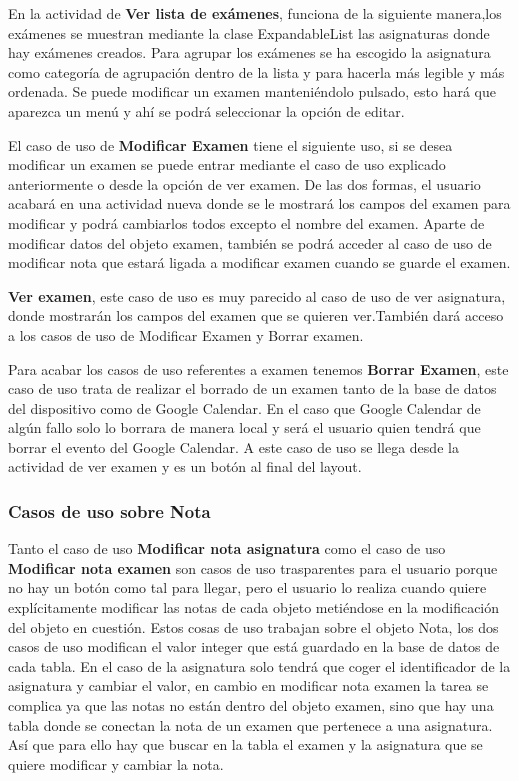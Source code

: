 En la actividad de \textbf{Ver lista de exámenes}, funciona de la siguiente manera,los exámenes se muestran mediante la clase ExpandableList las asignaturas donde hay exámenes creados. Para agrupar los exámenes se ha escogido la asignatura como categoría de agrupación dentro de la lista y para hacerla más legible y más ordenada.
Se puede modificar un examen manteniéndolo pulsado, esto hará que aparezca un menú y ahí se podrá seleccionar la opción de editar.

El caso de uso de \textbf{Modificar Examen} tiene el siguiente uso, si se desea modificar un examen se puede entrar mediante el caso de uso explicado anteriormente o desde la opción de ver examen. De las dos formas, el usuario acabará en una actividad nueva donde se le mostrará los campos del examen para modificar y podrá cambiarlos todos excepto el nombre del examen.
Aparte de modificar datos del objeto examen, también se podrá acceder al caso de uso de modificar nota  que estará ligada a modificar examen cuando se guarde el examen.

\textbf{Ver examen}, este caso de uso es muy parecido al caso de uso de ver asignatura, donde mostrarán los campos del examen que se quieren ver.También dará acceso a los casos de uso de Modificar Examen y Borrar examen.


Para acabar los casos de uso referentes a examen tenemos \textbf{Borrar Examen}, este caso de uso trata de realizar el borrado de un examen tanto de la base de datos del dispositivo como de Google Calendar. En el caso que Google Calendar de algún fallo solo lo borrara de manera local y será el usuario quien tendrá que borrar el evento del Google Calendar.
A este caso de uso se llega desde la actividad de ver examen y es un botón al final del layout.

\subsubsection{Casos de uso sobre Nota}
\label{subsubsecc:Casos de uso sobre Nota}

Tanto el caso de uso \textbf{Modificar nota asignatura} como el caso de uso \textbf{Modificar nota examen} son casos de uso trasparentes para el usuario porque no hay un botón como tal para llegar, pero el usuario lo realiza cuando quiere explícitamente modificar las notas de cada objeto metiéndose en la modificación del objeto en cuestión.
Estos cosas de uso trabajan sobre el objeto Nota, los dos casos de uso modifican el valor integer que está guardado en la base de datos de cada tabla. En el caso de la asignatura solo tendrá que coger el identificador de la asignatura y cambiar el valor, en cambio en modificar nota examen la tarea se complica ya que las notas no están dentro del objeto examen, sino que hay una tabla donde se conectan la nota de un examen que pertenece a una asignatura. Así que para ello hay que buscar en la tabla el examen y la asignatura que se quiere modificar y cambiar la nota.

